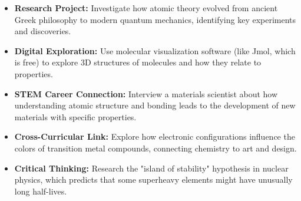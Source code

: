\begin{itemize}
    \item \textbf{Research Project:} Investigate how atomic theory evolved from ancient Greek philosophy to modern quantum mechanics, identifying key experiments and discoveries.
    
    \item \textbf{Digital Exploration:} Use molecular visualization software (like Jmol, which is free) to explore 3D structures of molecules and how they relate to properties.
    
    \item \textbf{STEM Career Connection:} Interview a materials scientist about how understanding atomic structure and bonding leads to the development of new materials with specific properties.
    
    \item \textbf{Cross-Curricular Link:} Explore how electronic configurations influence the colors of transition metal compounds, connecting chemistry to art and design.
    
    \item \textbf{Critical Thinking:} Research the "island of stability" hypothesis in nuclear physics, which predicts that some superheavy elements might have unusually long half-lives.
\end{itemize}